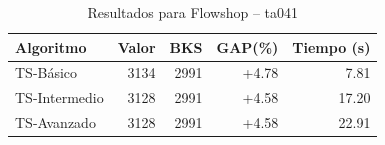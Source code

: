\begin{table}[h]
\centering
\caption{Resultados para Flowshop -- ta041}
\label{tab:flowshop_ta041}
\begin{tabular}{lrrrr}
\hline
\textbf{Algoritmo} & \textbf{Valor} & \textbf{BKS} & \textbf{GAP(\%)} & \textbf{Tiempo (s)} \\
\hline
TS-Básico & 3134 & 2991 & +4.78 & 7.81 \\
TS-Intermedio & 3128 & 2991 & +4.58 & 17.20 \\
TS-Avanzado & 3128 & 2991 & +4.58 & 22.91 \\
\hline
\end{tabular}
\end{table}
